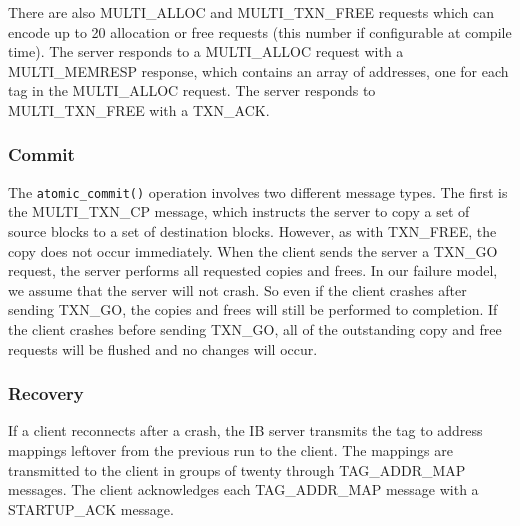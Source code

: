 There are also MULTI\_ALLOC and MULTI\_TXN\_FREE requests which can encode up
to 20 allocation or free requests (this number if configurable at compile time).
The server responds to a MULTI\_ALLOC request with a MULTI\_MEMRESP response,
which contains an array of addresses, one for each tag in the MULTI\_ALLOC
request. The server responds to MULTI\_TXN\_FREE with a TXN\_ACK.

\subsubsection{Commit}

The \texttt{atomic\_commit()} operation involves two different message types.
The first is the MULTI\_TXN\_CP message, which instructs the server to copy
a set of source blocks to a set of destination blocks. However, as with
TXN\_FREE, the copy does not occur immediately. When the client sends the
server a TXN\_GO request, the server performs all requested copies and frees.
In our failure model, we assume that the server will not crash. So even if
the client crashes after sending TXN\_GO, the copies and frees will still be
performed to completion. If the client crashes before sending TXN\_GO, all
of the outstanding copy and free requests will be flushed and no changes will
occur.

\subsubsection{Recovery}

If a client reconnects after a crash, the IB server transmits the tag to
address mappings leftover from the previous run to the client. The mappings
are transmitted to the client in groups of twenty through TAG\_ADDR\_MAP
messages. The client acknowledges each TAG\_ADDR\_MAP message with a
STARTUP\_ACK message.
